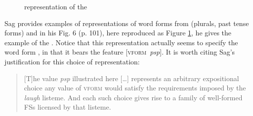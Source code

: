\documentclass[output=paper]{langsci/langscibook}
\begin{document}
\begin{figure}
\begin{center}



\caption{ %
%
representation of the  } \label{fig:Spencer:laugh}
\end{center}
\end{figure}

Sag provides examples of representations of word forms from  (plurals, past tense forms) and in his Fig. 6 (p. 101), here reproduced as Figure \ref{fig:Spencer:laugh}, he gives the example of the  .  Notice that this representation actually seems to specify the word form , in that it bears the feature  [\textsc{vform}~\textit{psp}]. It is worth citing Sag's  justification for this choice of representation:


\begin{quotation}
 [T]he value \textit{psp} illustrated here [\ldots] represents an arbitrary expositional choice \textemdash{\ } any value of \textsc{vform} would satisfy the requirements imposed by the \textit{laugh} listeme. And each such choice gives rise to a family of well-formed FSs licensed by that listeme.
 \citep[99]{Sag12}
\end{quotation}
\end{document}
